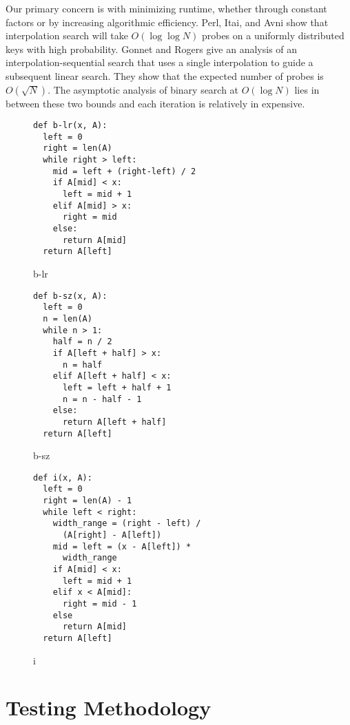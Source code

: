 \documentclass[twocolumn]{article}
\begin{document}
Our primary concern is with minimizing runtime, whether through constant factors or by increasing algorithmic efficiency. Perl, Itai, and Avni \cite{perl-itai-avni} show that interpolation search will take $O(\log \log N)$ probes on a uniformly distributed keys with high probability. Gonnet and Rogers \cite{gonnet-rogers} give an analysis of an interpolation-sequential search that uses a single interpolation to guide a subsequent linear search. They show that the expected number of probes is $O(\sqrt N)$. The asymptotic analysis of binary search at $O(\log N)$ lies in between these two bounds and each iteration is relatively in expensive.

\begin{figure}[ht]
\begin{verbatim}
def b-lr(x, A):
  left = 0
  right = len(A)
  while right > left:
    mid = left + (right-left) / 2
    if A[mid] < x:
      left = mid + 1
    elif A[mid] > x:
      right = mid 
    else:
      return A[mid]
  return A[left]
\end{verbatim}
\caption{b-lr}
  \label{b-lr-code}
\end{figure}

\begin{figure}[ht]
\begin{verbatim}
def b-sz(x, A):
  left = 0
  n = len(A)
  while n > 1:
    half = n / 2
    if A[left + half] > x:
      n = half
    elif A[left + half] < x:
      left = left + half + 1
      n = n - half - 1
    else:
      return A[left + half]
  return A[left]
\end{verbatim}
\caption{b-sz}
  \label{b-sz-code}
\end{figure}

\begin{figure}[ht]
\begin{verbatim}
def i(x, A):
  left = 0
  right = len(A) - 1
  while left < right:
    width_range = (right - left) /
      (A[right] - A[left])
    mid = left = (x - A[left]) *
      width_range
    if A[mid] < x:
      left = mid + 1
    elif x < A[mid]:
      right = mid - 1
    else
      return A[mid]
  return A[left]
\end{verbatim}
\caption{i}
  \label{i-code}
\end{figure}

\section{Testing Methodology}
\end{document}
